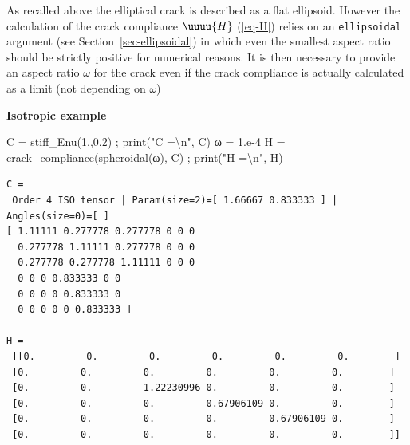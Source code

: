 \documentclass[
  letterpaper,
  DIV=11,
  numbers=noendperiod]{scrreprt}
\newenvironment{Shaded}{\begin{snugshade}}{\end{snugshade}}
\newcommand{\BuiltInTok}[1]{\textcolor[rgb]{0.00,0.23,0.31}{#1}}
\newcommand{\CharTok}[1]{\textcolor[rgb]{0.13,0.47,0.30}{#1}}
\newcommand{\FloatTok}[1]{\textcolor[rgb]{0.68,0.00,0.00}{#1}}
\newcommand{\NormalTok}[1]{\textcolor[rgb]{0.00,0.23,0.31}{#1}}
\newcommand{\OperatorTok}[1]{\textcolor[rgb]{0.37,0.37,0.37}{#1}}
\newcommand{\StringTok}[1]{\textcolor[rgb]{0.13,0.47,0.30}{#1}}
\begin{document}
\begin{tcolorbox}[enhanced jigsaw, left=2mm, bottomrule=.15mm, colbacktitle=quarto-callout-warning-color!10!white, colback=white, colframe=quarto-callout-warning-color-frame, rightrule=.15mm, bottomtitle=1mm, toptitle=1mm, titlerule=0mm, title=\textcolor{quarto-callout-warning-color}{\faExclamationTriangle}\hspace{0.5em}{Warning}, toprule=.15mm, arc=.35mm, opacityback=0, opacitybacktitle=0.6, leftrule=.75mm, breakable, coltitle=black]

As recalled above the elliptical crack is described as a flat ellipsoid.
However the calculation of the crack compliance \(\uuuu{H}\)
(\ref{eq-H}) relies on an \texttt{ellipsoidal} argument (see
Section~\ref{sec-ellipsoidal}) in which even the smallest aspect ratio
should be strictly positive for numerical reasons. It is then necessary
to provide an aspect ratio \(\omega\) for the crack even if the crack
compliance is actually calculated as a limit (not depending on
\(\omega\))

\end{tcolorbox}

\textbf{Isotropic example}

\begin{Shaded}
\begin{Highlighting}[]
\NormalTok{C }\OperatorTok{=}\NormalTok{ stiff\_Enu(}\FloatTok{1.}\NormalTok{,}\FloatTok{0.2}\NormalTok{) }\OperatorTok{;} \BuiltInTok{print}\NormalTok{(}\StringTok{"C =}\CharTok{\textbackslash{}n}\StringTok{"}\NormalTok{, C)}
\NormalTok{ω }\OperatorTok{=} \FloatTok{1.e{-}4}
\NormalTok{H }\OperatorTok{=}\NormalTok{ crack\_compliance(spheroidal(ω), C) }\OperatorTok{;} \BuiltInTok{print}\NormalTok{(}\StringTok{"H =}\CharTok{\textbackslash{}n}\StringTok{"}\NormalTok{, H)}
\end{Highlighting}
\end{Shaded}

\begin{verbatim}
C =
 Order 4 ISO tensor | Param(size=2)=[ 1.66667 0.833333 ] | Angles(size=0)=[ ]
[ 1.11111 0.277778 0.277778 0 0 0 
  0.277778 1.11111 0.277778 0 0 0 
  0.277778 0.277778 1.11111 0 0 0 
  0 0 0 0.833333 0 0 
  0 0 0 0 0.833333 0 
  0 0 0 0 0 0.833333 ]

H =
 [[0.         0.         0.         0.         0.         0.        ]
 [0.         0.         0.         0.         0.         0.        ]
 [0.         0.         1.22230996 0.         0.         0.        ]
 [0.         0.         0.         0.67906109 0.         0.        ]
 [0.         0.         0.         0.         0.67906109 0.        ]
 [0.         0.         0.         0.         0.         0.        ]]
\end{verbatim}
\end{document}
